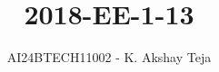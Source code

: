 \documentclass[journal,9pt,onecolumn]{IEEEtran}
\begin{document}

\vspace{3cm}
\title{2018-EE-1-13}
\author{AI24BTECH11002 - K. Akshay Teja}
\maketitle
 \bigskip
{\let\newpage\relax\maketitle}

\renewcommand{\thefigure}{\theenumi}
\renewcommand{\thetable}{\theenumi}
\setlength{\intextsep}{10pt} %

\renewcommand{\thetable}{\theenumi}
\end{document}
